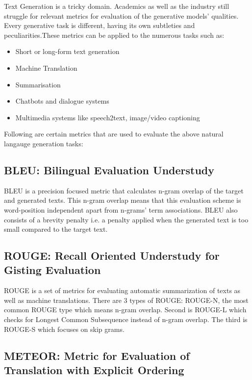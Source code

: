 
Text Generation is a tricky domain. Academics as well as the industry still struggle for relevant metrics for evaluation of the generative models' qualities. Every generative task is different, having its own subtleties and peculiarities.These metrics can be applied to the numerous tasks such as:
\begin{itemize}
	\item Short or long-form text generation
	\item Machine Translation
	\item Summarisation
	\item Chatbots and dialogue systems
	\item Multimedia systems like speech2text, image/video captioning
\end{itemize}
Following are certain metrics that are used to evaluate the above natural langauge generation tasks:

\subsection{BLEU: Bilingual Evaluation Understudy}

\par BLEU \cite{bleu} is a precision focused metric that calculates n-gram overlap of the target and generated texts. This n-gram overlap means that this evaluation scheme is word-position independent apart from n-grams' term associations. BLEU also consists of a brevity penalty i.e. a penalty applied when the generated text is too small compared to the target text.


\subsection{ROUGE: Recall Oriented Understudy for Gisting Evaluation}

\par ROUGE \cite{rouge} is a set of metrics for evaluating automatic summarization of texts as well as machine translations. There are 3 types of ROUGE: ROUGE-N, the most common ROUGE type which means n-gram overlap. Second is ROUGE-L which checks for Longest Common Subsequence instead of n-gram overlap. The third is ROUGE-S which focuses on skip grams.


\subsection{METEOR: Metric for Evaluation of Translation with Explicit Ordering}


